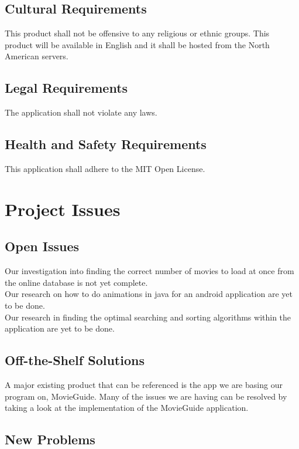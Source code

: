 \documentclass[12pt, titlepage]{article}
\begin{document}
\subsection{Cultural Requirements}
This product shall not be offensive to any religious or ethnic groups. This product will be available in English and it shall be hosted from the North American servers.

\subsection{Legal Requirements}

The application shall not violate any laws.

\subsection{Health and Safety Requirements}

This application shall adhere to the MIT Open License.


\section{Project Issues}

\subsection{Open Issues}

Our investigation into finding the correct number of movies to load at once from the online database is not yet complete.\\

Our research on how to do animations in java for an android application are yet to be done.\\

Our research in finding the optimal searching and sorting algorithms within the application are yet to be done.\\

\subsection{Off-the-Shelf Solutions}

A major existing product that can be referenced is the app we are basing our program on, MovieGuide. Many of the issues we are having can be resolved by taking a look at the implementation of the MovieGuide application.

\subsection{New Problems}
\end{document}
